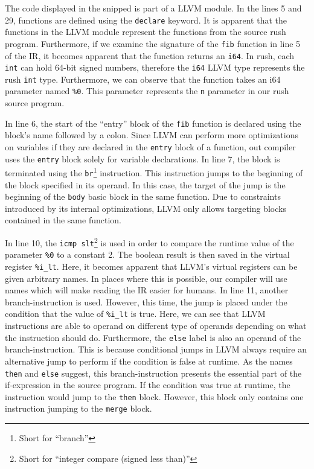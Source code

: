
The code displayed in the snipped is part of a LLVM module.
In the lines 5 and 29, functions are defined using the \texttt{declare} keyword.
It is apparent that the functions in the LLVM module represent the functions from the source rush program.
Furthermore, if we examine the signature of the \texttt{fib} function in line 5 of the IR,
it becomes apparent that the function returns an \texttt{i64}.
In rush, each \texttt{int} can hold 64-bit signed numbers, therefore the \texttt{i64} LLVM type represents the rush \texttt{int} type.
Furthermore, we can observe that the function takes an i64 parameter named \texttt{\%0}.
This parameter represents the \texttt{n} parameter in our rush source program.

In line 6, the start of the \enquote{entry} block of the \texttt{fib} function is declared using the block's name followed by a colon.
Since LLVM can perform more optimizations on variables if they are declared in the \texttt{entry} block of a function,
out compiler uses the \texttt{entry} block solely for variable declarations.
In line 7, the block is terminated using the \texttt{br}\footnote{Short for \enquote{branch}} instruction.
This instruction jumps to the beginning of the block specified in its operand.
In this case, the target of the jump is the beginning of the \texttt{body} basic block in the same function.
Due to constraints introduced by its internal optimizations, LLVM only allows targeting blocks contained in the same function.

In line 10, the \texttt{icmp slt}\footnote{Short for \enquote{integer compare (signed less than)}} is used in order to compare the runtime value of the parameter \texttt{\%0} to a constant 2.
The boolean result is then saved in the virtual register \texttt{\%i\_lt}.
Here, it becomes apparent that LLVM's virtual registers can be given arbitrary names.
In places where this is possible, our compiler will use names which will make reading the IR easier for humans.
In line 11, another branch-instruction is used.
However, this time, the jump is placed under the condition that the value of \texttt{\%i\_lt} is true.
Here, we can see that LLVM instructions are able to operand on different type of operands depending on what the instruction should do.
Furthermore, the \texttt{else} label is also an operand of the branch-instruction.
This is because conditional jumps in LLVM always require an alternative jump to perform if the condition is false at runtime.
As the names \texttt{then} and \texttt{else} suggest, this branch-instruction presents the essential part of the if-expression in the source program.
If the condition was true at runtime, the instruction would jump to the \texttt{then} block.
However, this block only contains one instruction jumping to the \texttt{merge} block.

